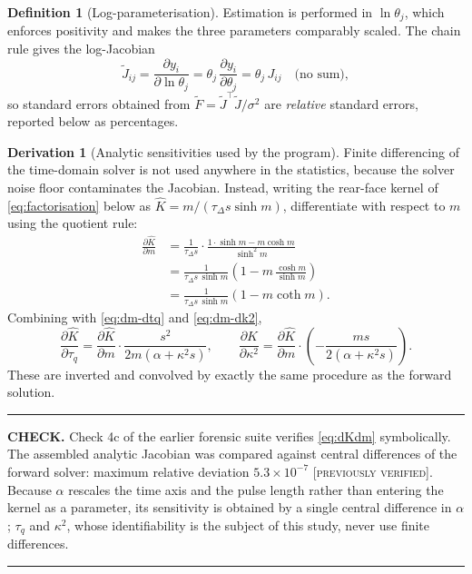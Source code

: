 \documentclass[11pt,a4paper]{article}
\theoremstyle{definition}
\newtheorem{definitionx}{Definition}[section]
\newtheorem{derivationx}{Derivation}[section]
\newenvironment{checkbox}%
  {\par\medskip\noindent\begin{minipage}{\linewidth}%
   \rule{\linewidth}{0.4pt}\par\noindent\textbf{CHECK.}\enspace}%
  {\par\rule{\linewidth}{0.4pt}\end{minipage}\par\medskip}
\newcommand{\PREV}{\textcolor{orange!70!black}{\footnotesize[\textsc{previously verified}]}}
\newcommand{\tq}{\tau_{q}}
\newcommand{\kk}{\kappa^{2}}
\newcommand{\Lap}[1]{\hat{#1}}
\begin{document}
\begin{definitionx}[Log-parameterisation]
\label{def:logparam}
Estimation is performed in $\ln\theta_{j}$, which enforces positivity and makes
the three parameters comparably scaled. The chain rule gives the log-Jacobian
\begin{equation}
  \tilde J_{ij}
   = \frac{\partial y_{i}}{\partial \ln\theta_{j}}
   = \theta_{j}\,\frac{\partial y_{i}}{\partial \theta_{j}}
   = \theta_{j}\,J_{ij}
   \quad\text{(no sum)} ,
  \label{eq:logJ}
\end{equation}
so standard errors obtained from $\tilde F=\tilde J^{\!\top}\tilde J/\sigma^{2}$
are \emph{relative} standard errors, reported below as percentages.
\end{definitionx}

\begin{derivationx}[Analytic sensitivities used by the program]
\label{der:analytic-sens}
Finite differencing of the time-domain solver is not used anywhere in the
statistics, because the solver noise floor contaminates the Jacobian. Instead,
writing the rear-face kernel of \eqref{eq:factorisation} below as
$\Lap K = m/(\tau_{\Delta}s\sinh m)$, differentiate with respect to $m$ using
the quotient rule:
\begin{align}
  \frac{\partial \Lap K}{\partial m}
   &= \frac{1}{\tau_{\Delta}s}\cdot
      \frac{1\cdot\sinh m - m\cosh m}{\sinh^{2}m}
  \label{eq:dKdm-1}\\
   &= \frac{1}{\tau_{\Delta}s\,\sinh m}
      \left(1 - m\,\frac{\cosh m}{\sinh m}\right)
  \label{eq:dKdm-2}\\
   &= \frac{1}{\tau_{\Delta}s\,\sinh m}\left(1 - m\coth m\right) .
  \label{eq:dKdm}
\end{align}
Combining with \eqref{eq:dm-dtq} and \eqref{eq:dm-dk2},
\begin{equation}
  \frac{\partial \Lap K}{\partial \tq}
   = \frac{\partial \Lap K}{\partial m}\cdot
     \frac{s^{2}}{2m(\alpha+\kk s)} ,
  \qquad
  \frac{\partial \Lap K}{\partial \kk}
   = \frac{\partial \Lap K}{\partial m}\cdot
     \left(-\frac{ms}{2(\alpha+\kk s)}\right) .
  \label{eq:dK-dparams}
\end{equation}
These are inverted and convolved by exactly the same procedure as the forward
solution.
\end{derivationx}

\begin{checkbox}
Check 4c of the earlier forensic suite verifies \eqref{eq:dKdm} symbolically.
The assembled analytic Jacobian was compared against central differences of the
forward solver: maximum relative deviation $5.3\times10^{-7}$ \PREV. Because
$\alpha$ rescales the time axis and the pulse length rather than entering the
kernel as a parameter, its sensitivity is obtained by a single central
difference in $\alpha$; $\tq$ and $\kk$, whose identifiability is the subject
of this study, never use finite differences.
\end{checkbox}
\end{document}

